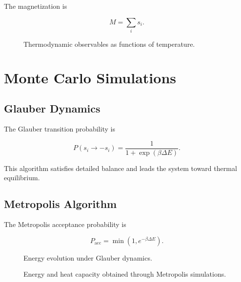\documentclass[a4paper]{article}
\begin{document}
The magnetization is

\begin{equation}
M = \sum_i s_i.
\end{equation}

\begin{figure}[H]
\centering
{}
\caption{Thermodynamic observables as functions of temperature.}
\end{figure}

\section{Monte Carlo Simulations}

\subsection{Glauber Dynamics}

The Glauber transition probability is

\begin{equation}
P(s_i \rightarrow -s_i)
=
\frac{1}
{1+\exp(\beta \Delta E)}.
\end{equation}

This algorithm satisfies detailed balance and leads the system toward thermal equilibrium.

\subsection{Metropolis Algorithm}

The Metropolis acceptance probability is

\begin{equation}
P_{\mathrm{acc}}
=
\min\left(
1,
e^{-\beta\Delta E}
\right).
\end{equation}

\begin{figure}[H]
\centering
{}
\caption{Energy evolution under Glauber dynamics.}
\end{figure}

\begin{figure}[H]
\centering
{}
\caption{Energy and heat capacity obtained through Metropolis simulations.}
\end{figure}
\end{document}
